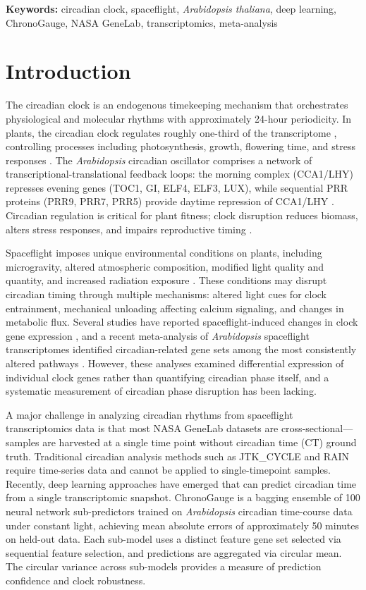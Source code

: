 \documentclass[11pt,a4paper]{article}
\begin{document}
\noindent\textbf{Keywords:} circadian clock, spaceflight, \textit{Arabidopsis thaliana}, deep learning, ChronoGauge, NASA GeneLab, transcriptomics, meta-analysis

\section*{Introduction}

The circadian clock is an endogenous timekeeping mechanism that orchestrates physiological and molecular rhythms with approximately 24-hour periodicity. In plants, the circadian clock regulates roughly one-third of the transcriptome \citep{Covington2008}, controlling processes including photosynthesis, growth, flowering time, and stress responses \citep{Harmer2000}. The \textit{Arabidopsis} circadian oscillator comprises a network of transcriptional-translational feedback loops: the morning complex (CCA1/LHY) represses evening genes (TOC1, GI, ELF4, ELF3, LUX), while sequential PRR proteins (PRR9, PRR7, PRR5) provide daytime repression of CCA1/LHY \citep{Pokhilko2012}. Circadian regulation is critical for plant fitness; clock disruption reduces biomass, alters stress responses, and impairs reproductive timing \citep{Dodd2005}.

Spaceflight imposes unique environmental conditions on plants, including microgravity, altered atmospheric composition, modified light quality and quantity, and increased radiation exposure \citep{Paul2012}. These conditions may disrupt circadian timing through multiple mechanisms: altered light cues for clock entrainment, mechanical unloading affecting calcium signaling, and changes in metabolic flux. Several studies have reported spaceflight-induced changes in clock gene expression \citep{Nayak2020, Kiss2019}, and a recent meta-analysis of \textit{Arabidopsis} spaceflight transcriptomes identified circadian-related gene sets among the most consistently altered pathways \citep{Barker2023}. However, these analyses examined differential expression of individual clock genes rather than quantifying circadian phase itself, and a systematic measurement of circadian phase disruption has been lacking.

A major challenge in analyzing circadian rhythms from spaceflight transcriptomics data is that most NASA GeneLab datasets are cross-sectional---samples are harvested at a single time point without circadian time (CT) ground truth. Traditional circadian analysis methods such as JTK\_CYCLE \citep{Hughes2010} and RAIN \citep{Thaben2014} require time-series data and cannot be applied to single-timepoint samples. Recently, deep learning approaches have emerged that can predict circadian time from a single transcriptomic snapshot. ChronoGauge \citep{Reynolds2025} is a bagging ensemble of 100 neural network sub-predictors trained on \textit{Arabidopsis} circadian time-course data under constant light, achieving mean absolute errors of approximately 50 minutes on held-out data. Each sub-model uses a distinct feature gene set selected via sequential feature selection, and predictions are aggregated via circular mean. The circular variance across sub-models provides a measure of prediction confidence and clock robustness.
\end{document}
